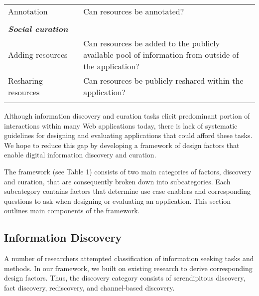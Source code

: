 \documentclass{casconpaper}
\begin{document}
{\begin{table*}[htbp]
\begin{tabular}{|p{0.30\linewidth}|p{0.70\linewidth}|}
Annotation                   & Can resources be annotated?                                                                               \\
&\\
\emph{\textbf{Social curation}}              &                                                                                                           \\
Adding resources             & Can resources be added to the publicly available pool of information from outside of the application?     \\
Resharing resources          & Can resources be publicly reshared within the application?         \\     
&\\          
\hline
\end{tabular}
\end{table*}

Although information discovery and curation tasks elicit predominant portion of interactions within many Web applications today, there is lack of systematic guidelines for designing and evaluating applications that could afford these tasks. We hope to reduce this gap by developing a framework of design factors that enable digital information discovery and curation. 

The framework (see Table 1) consists of two main categories of factors, discovery and curation, that are consequently broken down into subcategories. Each subcategory contains factors that determine use case enablers and corresponding questions to ask when designing or evaluating an application. This section outlines main components of the framework.

} %

{\subsection{Information Discovery}
A number of researchers attempted classification of information seeking tasks and methods. In our framework, we built on existing research to derive corresponding design factors. Thus, the discovery category consists of serendipitous discovery, fact discovery, rediscovery, and channel-based discovery. 
} %
\end{document}
